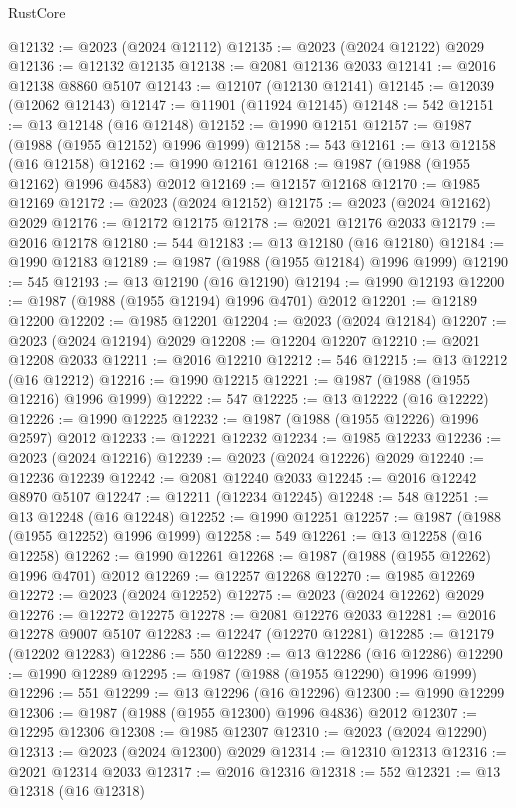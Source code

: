 \begin{lexlean}{RustCore}
\begin{coremodule}
@12132 := @2023 (@2024 @12112)
@12135 := @2023 (@2024 @12122) @2029
@12136 := @12132 @12135
@12138 := @2081 @12136 @2033
@12141 := @2016 @12138 @8860 @5107
@12143 := @12107 (@12130 @12141)
@12145 := @12039 (@12062 @12143)
@12147 := @11901 (@11924 @12145)
@12148 := 542
@12151 := @13 @12148 (@16 @12148)
@12152 := @1990 @12151
@12157 := @1987 (@1988 (@1955 @12152) @1996 @1999)
@12158 := 543
@12161 := @13 @12158 (@16 @12158)
@12162 := @1990 @12161
@12168 := @1987 (@1988 (@1955 @12162) @1996 @4583) @2012
@12169 := @12157 @12168
@12170 := @1985 @12169
@12172 := @2023 (@2024 @12152)
@12175 := @2023 (@2024 @12162) @2029
@12176 := @12172 @12175
@12178 := @2021 @12176 @2033
@12179 := @2016 @12178
@12180 := 544
@12183 := @13 @12180 (@16 @12180)
@12184 := @1990 @12183
@12189 := @1987 (@1988 (@1955 @12184) @1996 @1999)
@12190 := 545
@12193 := @13 @12190 (@16 @12190)
@12194 := @1990 @12193
@12200 := @1987 (@1988 (@1955 @12194) @1996 @4701) @2012
@12201 := @12189 @12200
@12202 := @1985 @12201
@12204 := @2023 (@2024 @12184)
@12207 := @2023 (@2024 @12194) @2029
@12208 := @12204 @12207
@12210 := @2021 @12208 @2033
@12211 := @2016 @12210
@12212 := 546
@12215 := @13 @12212 (@16 @12212)
@12216 := @1990 @12215
@12221 := @1987 (@1988 (@1955 @12216) @1996 @1999)
@12222 := 547
@12225 := @13 @12222 (@16 @12222)
@12226 := @1990 @12225
@12232 := @1987 (@1988 (@1955 @12226) @1996 @2597) @2012
@12233 := @12221 @12232
@12234 := @1985 @12233
@12236 := @2023 (@2024 @12216)
@12239 := @2023 (@2024 @12226) @2029
@12240 := @12236 @12239
@12242 := @2081 @12240 @2033
@12245 := @2016 @12242 @8970 @5107
@12247 := @12211 (@12234 @12245)
@12248 := 548
@12251 := @13 @12248 (@16 @12248)
@12252 := @1990 @12251
@12257 := @1987 (@1988 (@1955 @12252) @1996 @1999)
@12258 := 549
@12261 := @13 @12258 (@16 @12258)
@12262 := @1990 @12261
@12268 := @1987 (@1988 (@1955 @12262) @1996 @4701) @2012
@12269 := @12257 @12268
@12270 := @1985 @12269
@12272 := @2023 (@2024 @12252)
@12275 := @2023 (@2024 @12262) @2029
@12276 := @12272 @12275
@12278 := @2081 @12276 @2033
@12281 := @2016 @12278 @9007 @5107
@12283 := @12247 (@12270 @12281)
@12285 := @12179 (@12202 @12283)
@12286 := 550
@12289 := @13 @12286 (@16 @12286)
@12290 := @1990 @12289
@12295 := @1987 (@1988 (@1955 @12290) @1996 @1999)
@12296 := 551
@12299 := @13 @12296 (@16 @12296)
@12300 := @1990 @12299
@12306 := @1987 (@1988 (@1955 @12300) @1996 @4836) @2012
@12307 := @12295 @12306
@12308 := @1985 @12307
@12310 := @2023 (@2024 @12290)
@12313 := @2023 (@2024 @12300) @2029
@12314 := @12310 @12313
@12316 := @2021 @12314 @2033
@12317 := @2016 @12316
@12318 := 552
@12321 := @13 @12318 (@16 @12318)

\end{coremodule}
\end{lexlean}
